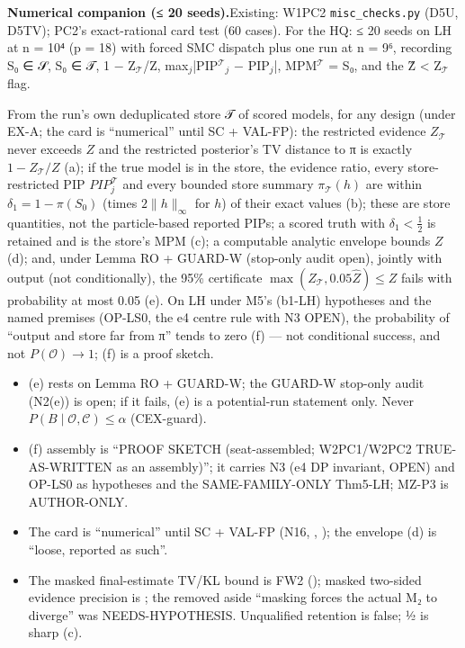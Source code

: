 {\par\smallskip\noindent\textbf{Numerical companion (≤ 20 seeds).}\enspace Existing: W1PC2 \texttt{misc\_checks.py} (D5U, D5TV); PC2's exact-rational card test (60 cases). For the HQ: ≤ 20 seeds on LH at n = 10⁴ (p = 18) with forced SMC dispatch plus one run at n = 9⁶, recording S₀ ∈ 𝒮, S₀ ∈ 𝒯, 1 − Z$_{𝒯}$/Z, max$_{j}$|PIP$^{𝒯}$$_{j}$ − PIP$_{j}$|, MPM$^{𝒯}$ = S₀, and the Ẑ \textless{} Z$_{𝒯}$ flag.
}

\begin{plain}
From the run's own deduplicated store 𝒯 of scored models, for any design (under EX-A; the card is ``numerical'' until SC + VAL-FP): the restricted evidence $Z_{\mathcal{T}}$ never exceeds $Z$ and the restricted posterior's TV distance to π is exactly $1-Z_{\mathcal{T}}/Z$ (a); if the true model is in the store, the evidence ratio, every store-restricted PIP $PIP^{\mathcal{T}}_j$ and every bounded store summary $\pi_{\mathcal{T}}(h)$ are within $\delta_1=1-\pi(S_0)$ (times $2\|h\|_{\infty}$ for $h$) of their exact values (b); these are store quantities, not the particle-based reported PIPs; a scored truth with $\delta_1<\tfrac12$ is retained and is the store's MPM (c); a computable analytic envelope bounds $Z$ (d); and, under Lemma RO + GUARD-W (stop-only audit open), jointly with output (not conditionally), the 95\% certificate $\max(Z_{\mathcal{T}},0.05\hat{Z})\le Z$ fails with probability at most 0.05 (e). On LH under M5's (b1-LH) hypotheses and the named premises (OP-LS0, the e4 centre rule with N3 OPEN), the probability of ``output and store far from π'' tends to zero (f) — not conditional success, and not $P(\mathcal{O})\to1$; (f) is a proof sketch.
\end{plain}

\begin{notproved}
\begin{itemize}
\item (e) rests on Lemma RO + GUARD-W; the GUARD-W stop-only audit (N2(e)) is open; if it fails, (e) is a potential-run statement only. Never $P(B\mid\mathcal{O},\mathcal{C})\le\alpha$ (CEX-guard).
\item (f) assembly is ``PROOF SKETCH (seat-assembled; W2PC1/W2PC2 TRUE-AS-WRITTEN as an assembly)''; it carries N3 (e4 DP invariant, OPEN) and OP-LS0 as hypotheses and the SAME-FAMILY-ONLY Thm5-LH; MZ-P3 is AUTHOR-ONLY.
\item The card is ``numerical'' until SC + VAL-FP (N16, , ); the envelope (d) is ``loose, reported as such''.
\item The masked final-estimate TV/KL bound is FW2 (); masked two-sided evidence precision is ; the removed aside ``masking forces the actual M₂ to diverge'' was NEEDS-HYPOTHESIS. Unqualified retention is false; ½ is sharp (c).
\end{itemize}
\end{notproved}

